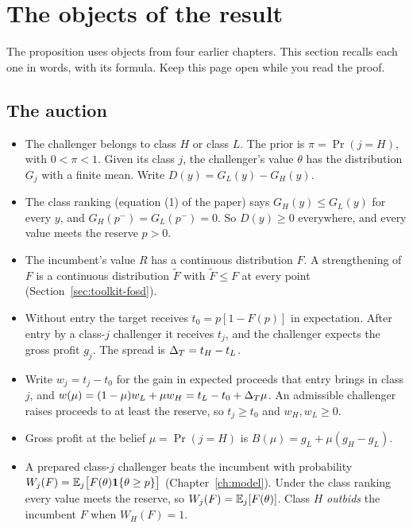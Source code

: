 \section{The objects of the result}\label{sec:ccc-setup}

The proposition uses objects from four earlier chapters. This section recalls each one in words, with its
formula. Keep this page open while you read the proof.

\subsection{The auction}

\begin{itemize}
\item The challenger belongs to class \(H\) or class \(L\). The prior is \(\pi=\Pr(j=H)\), with \(0<\pi<1\). Given
  its class \(j\), the challenger's value \(\theta\) has the distribution \(G_j\) with a finite mean. Write
  \(D(y)=G_L(y)-G_H(y)\).
\item The class ranking (equation (1) of the paper) says \(G_H(y)\le G_L(y)\) for every \(y\), and
  \(G_H(p^-)=G_L(p^-)=0\). So \(D(y)\ge0\) everywhere, and every value meets the reserve \(p>0\).
\item The incumbent's value \(R\) has a continuous distribution \(F\). A strengthening of \(F\) is a continuous
  distribution \(\tilde F\) with \(\tilde F\le F\) at every point (Section~\ref{sec:toolkit-fosd}).
\item Without entry the target receives \(t_0=p[1-F(p)]\) in expectation. After entry by a class-\(j\) challenger
  it receives \(t_j\), and the challenger expects the gross profit \(g_j\). The spread is \(\Delta_T=t_H-t_L\).
\item Write \(w_j=t_j-t_0\) for the gain in expected proceeds that entry brings in class \(j\), and
  \(w(\mu)=(1-\mu)w_L+\mu w_H=t_L-t_0+\Delta_T\mu\). An admissible challenger raises proceeds to at least the reserve,
  so \(t_j\ge t_0\) and \(w_H,w_L\ge0\).
\item Gross profit at the belief \(\mu=\Pr(j=H)\) is \(B(\mu)=g_L+\mu(g_H-g_L)\).
\item A prepared class-\(j\) challenger beats the incumbent with probability
  \(W_j(F)=\mathbb{E}_j\bigl[F(\theta)\mathbf{1}\{\theta\ge p\}\bigr]\) (Chapter~\ref{ch:model}). Under the class ranking every value
  meets the reserve, so \(W_j(F)=\mathbb{E}_j[F(\theta)]\). Class \(H\) \emph{outbids} the incumbent \(F\) when
  \(W_H(F)=1\).
\end{itemize}

